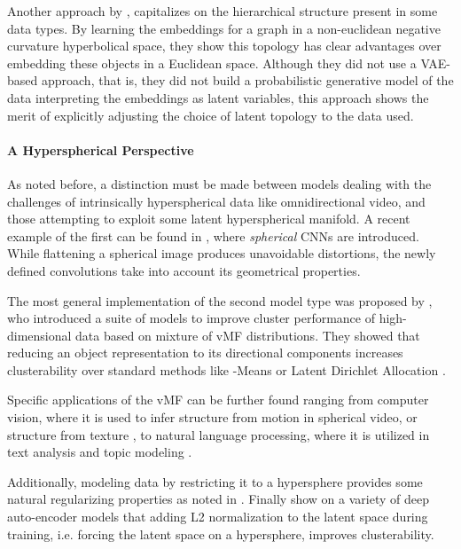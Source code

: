 \documentclass[letterpaper]{article}
\begin{document}
Another approach by \cite{nickel2017poincare}, capitalizes on the hierarchical structure present in some data types. By learning the embeddings for a graph in a non-euclidean negative curvature hyperbolical space, they show this topology has clear advantages over embedding these objects in a Euclidean space. Although they did not use a VAE-based approach, that is, they did not build a probabilistic generative model of the data interpreting the embeddings as latent variables, this approach shows the merit of explicitly adjusting the choice of latent topology to the data used.

\label{par:hyperspherical-perspective}
\paragraph{A Hyperspherical Perspective}
As noted before, a distinction must be made between models dealing with the challenges of intrinsically hyperspherical data like omnidirectional video, and those attempting to exploit some latent hyperspherical manifold. A recent example of the first can be found in \cite{s.2018spherical}, where \textit{spherical} CNNs are introduced. While flattening a spherical image produces unavoidable distortions, the newly defined convolutions take into account its geometrical properties. 

The most general implementation of the second model type was proposed by \cite{gopal2014mises}, who introduced a suite of models to improve cluster performance of high-dimensional data based on mixture of vMF distributions. They showed that reducing an object representation to its directional components increases clusterability over standard methods like -Means or Latent Dirichlet Allocation \citep{blei2003latent}.


Specific applications of the vMF can be further found ranging from computer vision, where it is used to infer structure from motion \citep{guan2017structure} in spherical video, or structure from texture \citep{wilson2014spherical-texture}, to natural language processing, where it is utilized in text analysis \citep{banerjee2003generative-text, banerjee2005clustering} and topic modeling \citep{banerjee2007topic, reisinger:icml10}. 

Additionally, modeling data by restricting it to a hypersphere provides some natural regularizing properties as noted in \citep{liu-nips17-hypersphere-cnn}. Finally \citet{aytekin2018clustering} show on a variety of deep auto-encoder models that adding L2 normalization to the latent space during training, i.e. forcing the latent space on a hypersphere, improves clusterability.
\end{document}
